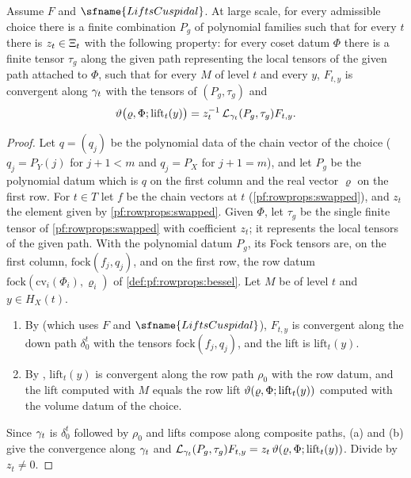\begin{lemma}\label{pf:rowprops:initial}
Assume $F$ and $\sfname{LiftsCuspidal}$. At large scale, for every admissible choice there is a finite combination $P_g$
of polynomial families such that for every $t$ there is $z_t\in\Xi_t$ with the following property: for every
coset datum $\Phi$ there is a finite tensor $\tau_g$ along the given path representing the local tensors of the given
path attached to $\Phi$, such that for every $M$ of level $t$ and every $y$, $F_{t,y}$ is convergent along
$\gamma_t$ with the tensors of $(P_g,\tau_g)$ and
\[
\vartheta\bigl(\varrho,\Phi;\mathrm{lift}_t(y)\bigr)=z_t^{-1}\,\mathcal{L}_{\gamma_t}(P_g,\tau_g)F_{t,y}.
\]
\end{lemma}

\begin{proof}
Let $q=(q_j)$ be the polynomial data of the chain vector of the choice ($q_j=P_Y(j)$ for $j+1<m$ and $q_j=P_X$ for $j+1=m$),
and let $P_g$ be the polynomial datum which is $q$ on the first column and the real vector $\varrho$ on the first row. For
$t\in T$ let $f$ be the chain vectors at $t$ (\cref{pf:rowprops:swapped}), and $z_t$ the element given by
\cref{pf:rowprops:swapped}. Given $\Phi$, let $\tau_g$ be the single finite tensor of \cref{pf:rowprops:swapped} with
coefficient $z_t$; it represents the local tensors of the given path. With the polynomial datum $P_g$, its Fock tensors
are, on the first column, $\mathrm{fock}(f_j,q_j)$, and on the first row, the row datum $\mathrm{fock}(\mathrm{cv}_i(\Phi_i),\varrho_i)$
of \cref{def:pf:rowprops:bessel}. Let $M$ be of level $t$ and $y\in H_X(t)$.
\begin{enumerate}[label=(\alph*)]
\item By  (which uses $F$ and $\sfname{LiftsCuspidal}$), $F_{t,y}$ is convergent
along the down path $\delta^t_0$ with the tensors $\mathrm{fock}(f_j,q_j)$, and the lift is $\mathrm{lift}_t(y)$.
\item By , $\mathrm{lift}_t(y)$ is convergent along the
row path $\rho_0$ with the row datum, and the lift computed with $M$ equals the row lift
$\vartheta(\varrho,\Phi;\mathrm{lift}_t(y))$ computed with the volume datum of the choice.
\end{enumerate}
Since $\gamma_t$ is $\delta^t_0$ followed by $\rho_0$ and lifts compose along composite paths, (a) and (b) give the
convergence along $\gamma_t$ and $\mathcal{L}_{\gamma_t}(P_g,\tau_g)F_{t,y}=z_t\,\vartheta(\varrho,\Phi;\mathrm{lift}_t(y))$.
Divide by $z_t\ne0$.
\end{proof}

